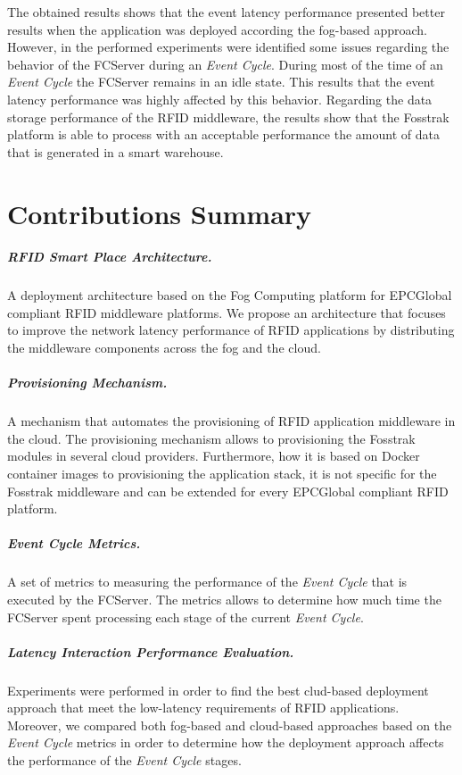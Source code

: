 The obtained results shows that the event latency performance presented better results when the
application was deployed according the fog-based approach. However, in the performed experiments
were identified some issues regarding the behavior of the FCServer during an \textit{Event Cycle}.
During most of the time of an \textit{Event Cycle} the FCServer remains in an idle state. This
results that the event latency performance was highly affected by this behavior. Regarding the data
storage performance of the \gls{RFID} middleware, the results show that the Fosstrak platform is
able to process with an acceptable performance the amount of data that is generated in a smart
warehouse.

\section{Contributions Summary}
\label{sec:contributions}

\subparagraph{RFID Smart Place Architecture.}
\label{subp:rfid_smart_place_architecture}
A deployment architecture based on the Fog Computing platform for EPCGlobal compliant \gls{RFID}
middleware platforms. We propose an architecture that focuses to improve the network latency
performance of \gls{RFID} applications by distributing the middleware components across the fog and
the cloud.

\subparagraph{Provisioning Mechanism.}
\label{subp:provisioning_mechanism}
A mechanism that automates the provisioning of \gls{RFID} application middleware in the cloud.
The provisioning mechanism allows to provisioning the Fosstrak modules in several cloud
providers. Furthermore, how it is based on Docker container images to provisioning the application
stack, it is not specific for the Fosstrak middleware and can be extended for every EPCGlobal
compliant \gls{RFID} platform.

\subparagraph{Event Cycle Metrics.}
\label{subp:event_latency_metrics}
A set of metrics to measuring the performance of the \textit{Event Cycle} that is executed by the
FCServer. The metrics allows to determine how much time the FCServer spent processing each stage of
the current \textit{Event Cycle}.

\subparagraph{Latency Interaction Performance Evaluation.}
\label{subp:event_latency_performance_eval}
Experiments were performed in order to find the best clud-based deployment approach that meet the
low-latency requirements of \gls{RFID} applications. Moreover, we compared both fog-based and cloud-based
approaches based on the \textit{Event Cycle} metrics in order to determine how the deployment
approach affects the performance of the \textit{Event Cycle} stages.

